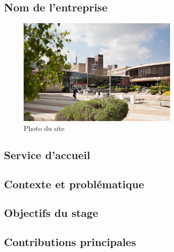 
\subsection{Nom de l'entreprise}\label{ssec:introduction_nom_entreprise}


\begin{figure}[!h]
    \centering
    \includegraphics[width=0.7\textwidth]{img/campus_tsp.jpg}
    \caption{Photo du site}
    \label{fig:photo_site}
\end{figure}


\subsection{Service d'accueil}\label{ssec:introduction_service_accueil}



\subsection{Contexte et problématique}\label{ssec:introduction_contexte_problematique}



\subsection{Objectifs du stage}\label{ssec:introduction_objectifs}



\subsection{Contributions principales}\label{ssec:introduction_contributions}


